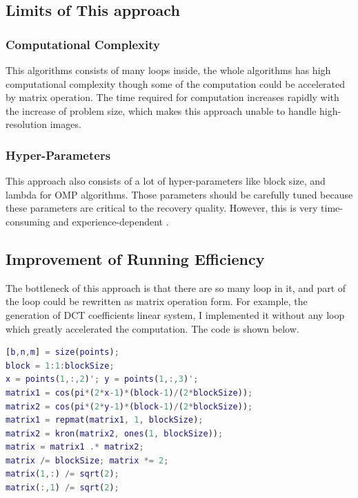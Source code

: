 \documentclass{article}
\begin{document}
\subsection{Limits of This approach}
\subsubsection{Computational Complexity}
This algorithms consists of many loops inside, the whole algorithms has high computational complexity though some of the computation could be accelerated by matrix operation. The time required for computation increases rapidly with the increase of problem size, which makes this approach unable to handle high-resolution images.
\subsubsection{Hyper-Parameters}
This approach also consists of a lot of hyper-parameters like block size, and lambda for OMP algorithms. Those parameters should be carefully tuned because these parameters are critical to the recovery quality. However, this is very time-consuming and experience-dependent . 

\subsection{Improvement of Running Efficiency}
The bottleneck of this approach is that there are so many loop in it, and part of the loop could be rewritten as matrix operation form. For example, the generation of DCT coefficients linear system, I implemented it without any loop which greatly accelerated the computation. The code is shown below.
\begin{lstlisting}[language=matlab]
[b,n,m] = size(points);
block = 1:1:blockSize;
x = points(1,:,2)'; y = points(1,:,3)';
matrix1 = cos(pi*(2*x-1)*(block-1)/(2*blockSize));
matrix2 = cos(pi*(2*y-1)*(block-1)/(2*blockSize));
matrix1 = repmat(matrix1, 1, blockSize);
matrix2 = kron(matrix2, ones(1, blockSize));
matrix = matrix1 .* matrix2;
matrix /= blockSize; matrix *= 2;
matrix(1,:) /= sqrt(2);
matrix(:,1) /= sqrt(2);
\end{lstlisting}
\end{document}
